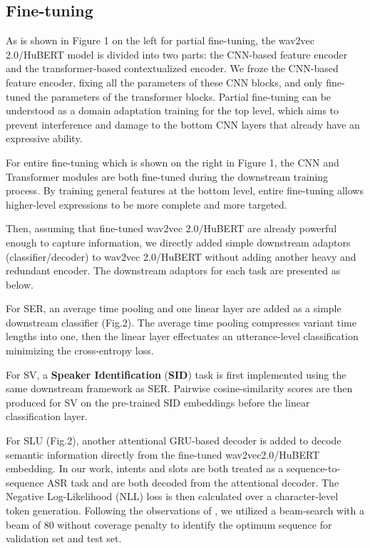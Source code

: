 \documentclass{article}
\begin{document}
\subsection{Fine-tuning}
As is shown in Figure 1 on the left for partial fine-tuning, the wav2vec 2.0/HuBERT model is divided into two parts: the CNN-based feature encoder and the transformer-based contextualized encoder. We froze the CNN-based feature encoder, fixing all the parameters of these CNN blocks, and only fine-tuned the parameters of the transformer blocks. Partial fine-tuning can be understood as a domain adaptation training for the top level, which aims to prevent interference and damage to the bottom CNN layers that already have an expressive ability.

For entire fine-tuning which is shown on the right in Figure 1, the CNN and Transformer modules are both fine-tuned during the downstream training process. By training general features at the bottom level, entire fine-tuning allows higher-level expressions to be more complete and more targeted.



Then, assuming that fine-tuned wav2vec 2.0/HuBERT are already powerful enough to capture information, we directly added simple downstream adaptors (classifier/decoder) to wav2vec 2.0/HuBERT without adding another heavy and redundant encoder. The downstream adaptors for each task are presented as below.

For SER, an average time pooling and one linear layer are added as a simple downstream classifier (Fig.2). The average time pooling compresses variant time lengths into one, then the linear layer effectuates an utterance-level classification minimizing the cross-entropy loss.

For SV, a \textbf{Speaker Identification} (\textbf{SID}) task is first implemented using the same downstream framework as SER. Pairwise cosine-similarity scores are then produced for SV on the pre-trained SID embeddings before the linear classification layer.

For SLU (Fig.2), another attentional GRU-based decoder is added to decode semantic information directly from the fine-tuned wav2vec2.0/HuBERT embedding. In our work, intents and slots are both treated as a sequence-to-sequence ASR task and are both decoded from the attentional decoder. The Negative Log-Likelihood (NLL) loss is then calculated over a character-level token generation. Following the observations of \cite{timers_and_such}, we utilized a beam-search with a beam of 80 without coverage penalty to identify the optimum sequence for validation set and test set.
\end{document}
